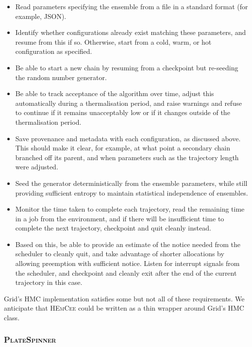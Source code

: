 \documentclass{article}
\newcommand\program[1]{\textsc{#1}\xspace}
\begin{document}
\begin{itemize}
  \item
        Read parameters specifying the ensemble from a file in a standard format
        (for example, JSON).
  \item
        Identify whether configurations already exist matching these parameters,
        and resume from this if so.
        Otherwise,
        start from a cold, warm, or hot configuration as specified.
  \item
        Be able to start a new chain by resuming from a checkpoint
        but re-seeding the random number generator.
  \item
        Be able to track acceptance of the algorithm over time,
        adjust this automatically during a thermalisation period,
        and raise warnings and refuse to continue if it remains unacceptably low
        or if it changes outside of the thermalisation period.
  \item
        Save provenance and metadata with each configuration,
        as discussed above.
        This should make it clear,
        for example,
        at what point a secondary chain branched off its parent,
        and when parameters such as the trajectory length were adjusted.
  \item
        Seed the generator deterministically from the ensemble parameters,
        while still providing sufficient entropy to maintain statistical independence of ensembles.
  \item
        Monitor the time taken to complete each trajectory,
        read the remaining time in a job from the environment,
        and if there will be insufficient time to complete the next trajectory,
        checkpoint and quit cleanly instead.
  \item
        Based on this,
        be able to provide an estimate of the notice needed from the scheduler to cleanly quit,
        and take advantage of shorter allocations by allowing preemption with sufficient notice.
        Listen for interrupt signals from the scheduler,
        and checkpoint and cleanly exit after the end of the current trajectory in this case.
\end{itemize}

Grid's HMC implementation satisfies some but not all of these requirements.
We anticipate that \program{HEmCee} could be written as a thin wrapper around Grid's HMC class.

\subsubsection{\program{PlateSpinner}}
\end{document}
